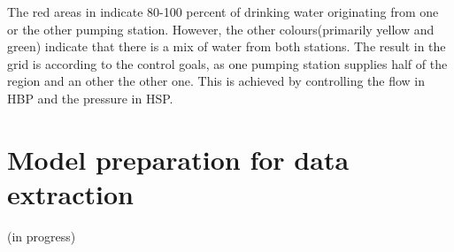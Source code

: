 The red areas in  indicate 80-100 percent of drinking water originating from one or the other pumping station. However, the other colours(primarily yellow and green) indicate that there is a mix of water from both stations. The result in the grid is according to the control goals, as one pumping station supplies half of the region and an other the other one. This is achieved by controlling the flow in HBP and the pressure in HSP. 

\section{Model preparation for data extraction}
\label{model_preparation_for_data_extraction}
(in progress)


















